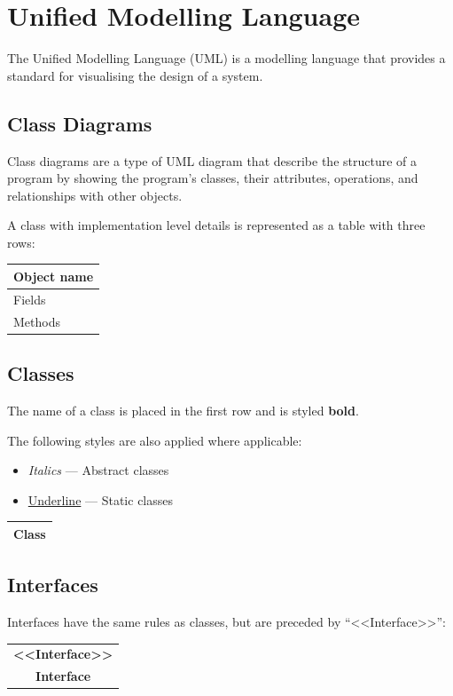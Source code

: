 \documentclass{article}
\begin{document}
\section{Unified Modelling Language}
The Unified Modelling Language (UML) is a modelling language that provides a standard for visualising the
design of a system.
\subsection{Class Diagrams}
Class diagrams are a type of UML diagram that describe the structure of a program by showing the program's classes,
their attributes, operations, and relationships with other objects.

A class with implementation level details is represented as a table with three rows:
\begin{table}[H]
    \centering
    \begin{tabular}{|l|} %
        \hline %
        \textbf{Object name} \\
        \hline %
        Fields               \\
        \hline %
        Methods              \\
        \hline %
    \end{tabular}
\end{table}
\subsection{Classes}
The name of a class is placed in the first row and is styled \textbf{bold}.

The following styles are also applied where applicable:
\begin{itemize}
    \item \textit{Italics} --- Abstract classes
    \item \underline{Underline} --- Static classes
\end{itemize}
\begin{table}[H]
    \centering
    \begin{tabular}{|c|} %
        \hline %
        \textbf{Class} \\
        \hline %
    \end{tabular}
\end{table}
\subsection{Interfaces}
Interfaces have the same rules as classes, but are preceded by ``<<Interface>>'':
\begin{table}[H]
    \centering
    \begin{tabular}{|c|} %
        \hline %
        \textbf{<<Interface>>} \\
        \textbf{Interface}     \\
        \hline %
    \end{tabular}
\end{table}
\end{document}
